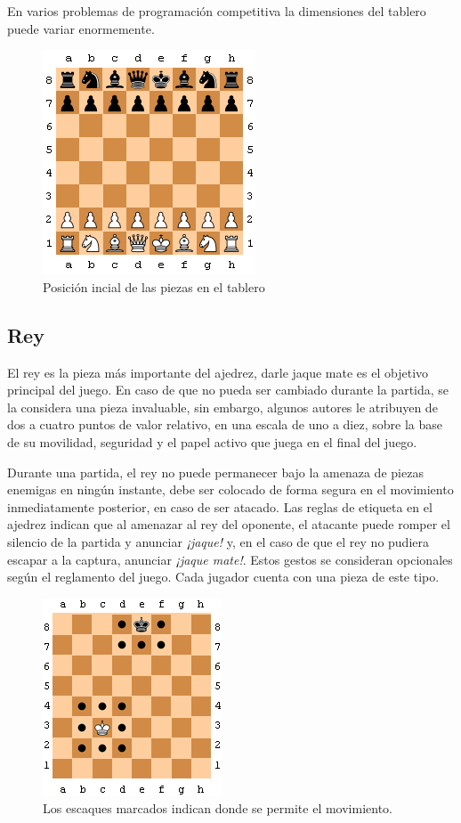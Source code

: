 En varios problemas de programación competitiva la dimensiones del tablero puede variar enormemente.

\begin{figure}[!h]
	\centering 
	\includegraphics[scale=0.70]{img/posicioni_inicial_ajedrez}
	\caption{Posición incial de las piezas en el tablero}
	\label{contexto:figuratablero}
\end{figure}

\subsection{Rey}

El rey es la pieza más importante del ajedrez, darle jaque mate es el objetivo principal del juego. En caso de que no pueda ser cambiado durante la partida, se la considera una pieza invaluable, sin embargo, algunos autores le atribuyen de dos a cuatro puntos de valor relativo, en una escala de uno a diez, sobre la base de su movilidad, seguridad y el papel activo que juega en el final del juego.

Durante una partida, el rey no puede permanecer bajo la amenaza de piezas enemigas en ningún instante, debe ser colocado de forma segura en el movimiento inmediatamente posterior, en caso de ser atacado. Las reglas de etiqueta en el ajedrez indican que al amenazar al rey del oponente, el atacante puede romper el silencio de la partida y anunciar \emph{¡jaque!} y, en el caso de que el rey no pudiera escapar a la captura, anunciar \emph{¡jaque mate!}. Estos gestos se consideran opcionales según el reglamento del juego.  Cada jugador cuenta con una pieza de este tipo.

\begin{figure}[!h]
	\centering 
	\includegraphics[scale=0.75]{img/movrey}
	\caption{Los escaques marcados indican donde se permite el movimiento.}
	\label{contexto:figurarey}
\end{figure}

